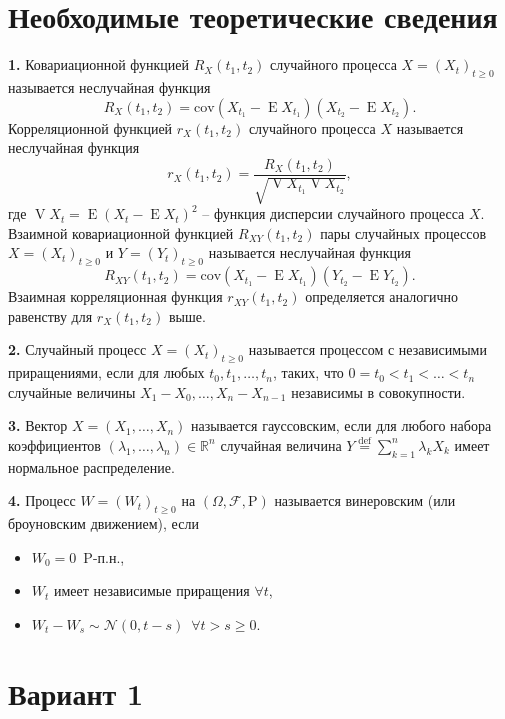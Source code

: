 \documentclass[a4paper,14pt]{extreport}
\renewcommand{\=}[1]{\stackrel{#1}{=}} %
\newcommand{\Expect}{\mathop{{}\mathrm{E}}}
\newcommand{\Proba}{\mathrm{P}}
\newcommand{\Var}{\mathop{{}\mathrm{V}}}
\newcommand{\generaltime}{t \geqslant 0}
\newcommand{\newprocess}[1]{
	\ensuremath{
		#1 = \left(#1 _t\right)_{\generaltime}
	}
}
\begin{document}
\newpage

\section*{Необходимые теоретические сведения}

\textbf{1.} Ковариационной функцией $R_X(t_1, t_2)$ случайного процесса
$\newprocess{X}$ называется неслучайная функция
\[
R_X(t_1, t_2) = \mathrm{cov} (X_{t_1} - \Expect X_{t_1}) (X_{t_2} - \Expect X_{t_2}).
\]
Корреляционной функцией $r_X(t_1, t_2)$ случайного процесса $X$ 
называется неслучайная функция 
\[
r_X(t_1, t_2) = \frac{R_X(t_1, t_2)}{\sqrt{\Var X_{t_1} \Var X_{t_2}}},
\]
где $\Var X_t = \Expect (X_t - \Expect X_t)^2$ -- функция дисперсии
случайного процесса $X$.
Взаимной ковариационной функцией $R_{XY}(t_1, t_2)$ пары 
случайных процессов $\newprocess{X}$ и $\newprocess{Y}$
называется неслучайная функция 
\[
R_{XY}(t_1, t_2) = \mathrm{cov} (X_{t_1} - \Expect X_{t_1}) (Y_{t_2} - \Expect Y_{t_2}).
\]
Взаимная корреляционная функция $r_{XY}(t_1, t_2)$ определяется
аналогично равенству для $r_X(t_1, t_2)$ выше.

\textbf{2.} Случайный процесс $\newprocess{X}$ называется процессом
с независимыми приращениями, если для любых $t_0, t_1, \ldots, t_n$,
таких, что $0 = t_0 < t_1 < \ldots < t_n$ случайные величины
$X_1 - X_0, \ldots, X_{n} - X_{n-1}$ независимы в совокупности.

\textbf{3.} Вектор $X = (X_1, \dots, X_n)$ называется
гауссовским, если для любого набора коэффициентов
$(\lambda_1, \dots, \lambda_n) \in \mathbb{R}^n$
случайная величина $Y \stackrel{\text{def}}{=}
\sum_{k=1}^n \lambda_k X_k$ имеет нормальное распределение. 

\textbf{4.} Процесс $\newprocess{W}$ на $(\Omega, \mathcal{F}, \Proba)$
называется винеровским (или броуновским движением), если 
\begin{itemize}
    \item $W_0 = 0 \,\,\, \Proba$-п.н.,
    \item $W_t$ имеет независимые приращения $\forall t$,
    \item $W_t - W_s \sim \mathcal{N}(0, t- s) \,\,\, \forall t > s \ge 0$.
\end{itemize}


\newpage


\section*{Вариант 1}
\end{document}
